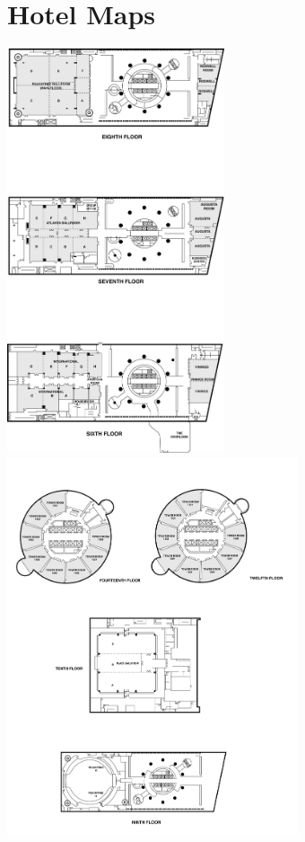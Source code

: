 \section{Hotel Maps}
\setlength{\parindent}{0in}
\setlength{\parskip}{2ex}
\renewcommand{\baselinestretch}{0.87}

\begin{center}
\includegraphics[height=450px]{content/map1.pdf}
\includegraphics[height=420px]{content/map2.pdf}
\end{center}
